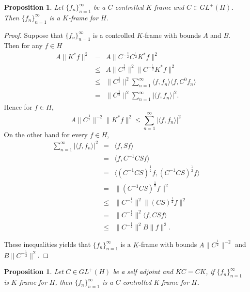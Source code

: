 \documentclass[11pt]{amsart}
\newtheorem{prop}[thm]{Proposition}
\theoremstyle{definition}
\theoremstyle{remark}
\numberwithin{equation}{section}
\begin{document}
\begin{prop}
Let $\{f_n\}_{n=1}^\infty$ be a $C$-controlled $K$-frame and $C\in GL^+(H)$. Then  $\{f_n\}_{n=1}^\infty$ is a $K$-frame for $H$.
\end{prop}
\begin{proof}
Suppose that $\{f_n\}_{n=1}^\infty$ is a controlled $K$-frame  with bounds $A$ and $B$. Then for any $f\in H$
\begin{eqnarray*}
A\|K^*f\|^2 & = & A\|C^{-\frac{1}{2}}C^{\frac{1}{2}}K^*f\|^2\\
 & \le &  A\|C^{\frac{1}{2}}\|^2\|C^{-\frac{1}{2}}K^*f\|^2\\
 & \le & \|C^{\frac{1}{2}}\|^2\sum_{n=1}^{\infty}\langle f,f_n\rangle\langle f,C^0f_n\rangle\\
  & = &\|C^{\frac{1}{2}}\|^2\sum_{n=1}^{\infty}|\langle f,f_n\rangle|^2.
\end{eqnarray*}
Hence for $f\in H$,
\[A\|C^{\frac{1}{2}}\|^{-2}\|K^*f\|^2\le \sum_{n=1}^{\infty}|\langle f,f_n\rangle|^2\]
On the other hand for every $f\in H$,
\begin{eqnarray*}
\sum_{n=1}^{\infty}|\langle f,f_n\rangle|^2 & = & \langle f,Sf\rangle\\
& = &\langle f,C^{-1}CSf\rangle\\
 & = &  \langle(C^{-1}CS)^{\frac{1}{2}}f,(C^{-1}CS)^{\frac{1}{2}}f\rangle\\
 & = & \|(C^{-1}CS)^{\frac{1}{2}}f\|^2\\
 & \le & \|C^{-\frac{1}{2}}\|^2\|(CS)^{\frac{1}{2}}f\|^2\\
 & = & \|C^{-\frac{1}{2}}\|^2\langle f,CSf\rangle\\
 & \le & \|C^{-\frac{1}{2}}\|^2B\|f\|^2.
\end{eqnarray*}

These inequalities yields that $\{f_n\}_{n=1}^\infty$ is a $K$-frame  with bounds $A\|C^{\frac{1}{2}}\|^{-2}$ and $B\|C^{-\frac{1}{2}}\|^2$.
\end{proof}
\begin{prop}
Let $C\in GL^+(H)$ be a self adjoint  and $KC=CK$, if $\{f_n\}_{n=1}^\infty$ is $K$-frame for $H$, then $\{f_n\}_{n=1}^\infty$ is a $C$-controlled K-frame for $H$.
\end{prop}
\end{document}
